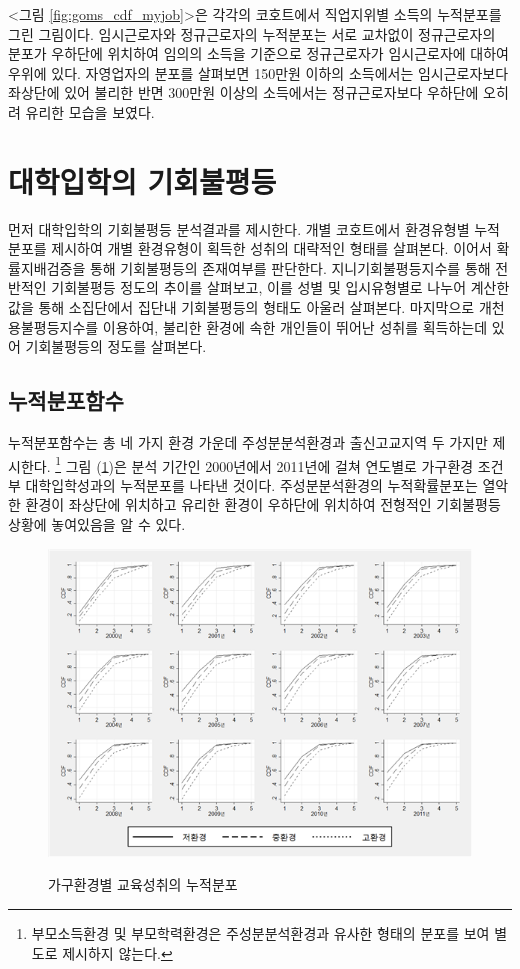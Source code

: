  <그림 \ref{fig:goms_cdf_myjob}>은 각각의 코호트에서 직업지위별 소득의 누적분포를 그린 그림이다.
 임시근로자와 정규근로자의 누적분포는 서로 교차없이 정규근로자의 분포가 우하단에 위치하여 임의의 소득을 기준으로 정규근로자가 임시근로자에 대하여 우위에 있다.
  자영업자의 분포를 살펴보면 150만원 이하의 소득에서는 임시근로자보다  좌상단에 있어 불리한 반면 300만원 이상의 소득에서는 정규근로자보다 우하단에 오히려 유리한 모습을 보였다.
 
\section{대학입학의 기회불평등}
먼저 대학입학의 기회불평등 분석결과를 제시한다.
개별 코호트에서 환경유형별 누적분포를 제시하여 개별 환경유형이 획득한 성취의 대략적인 형태를 살펴본다.
 이어서 확률지배검증을 통해 기회불평등의 존재여부를 판단한다.
 지니기회불평등지수를 통해 전반적인 기회불평등 정도의 추이를 살펴보고, 이를 성별 및 입시유형별로 나누어 계산한 값을 통해 소집단에서 집단내 기회불평등의 형태도 아울러 살펴본다.
 마지막으로 개천용불평등지수를 이용하여, 불리한 환경에 속한 개인들이 뛰어난 성취를 획득하는데 있어 기회불평등의 정도를 살펴본다.

\subsection{누적분포함수}
누적분포함수는 총 네 가지 환경 가운데 주성분분석환경과 출신고교지역 두 가지만 제시한다.
\footnote{부모소득환경 및 부모학력환경은 주성분분석환경과 유사한 형태의 분포를 보여 별도로 제시하지 않는다.}
그림 (\ref{fig:goms_cdf_bypca})은 분석 기간인 2000년에서 2011년에 걸쳐 연도별로 가구환경 조건부 대학입학성과의 누적분포를 나타낸 것이다.
주성분분석환경의 누적확률분포는 열악한 환경이 좌상단에 위치하고 유리한 환경이 우하단에 위치하여 전형적인 기회불평등 상황에 놓여있음을 알 수 있다. 

\begin{figure}
    \centering
    \caption{가구환경별 교육성취의 누적분포}
    \includegraphics[width=\textwidth]{figure/goms_cdf_bypca.png}
    \label{fig:goms_cdf_bypca}
\end{figure}


